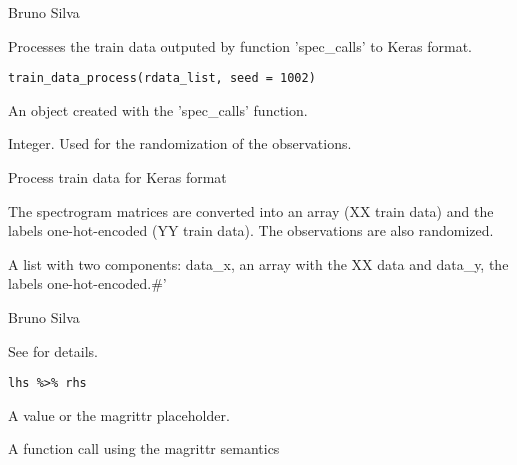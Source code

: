 \documentclass[letterpaper]{book}
\begin{document}
%
\begin{Author}\relax
Bruno Silva
\end{Author}
%
\begin{Description}\relax
Processes the train data outputed by function 'spec\_calls' to
Keras format.
\end{Description}
%
\begin{Usage}
\begin{verbatim}
train_data_process(rdata_list, seed = 1002)
\end{verbatim}
\end{Usage}
%
\begin{Arguments}
\begin{ldescription}
\item[\code{rdata\_list}] An object created with
the 'spec\_calls' function.

\item[\code{seed}] Integer. Used for the randomization of the observations.
\end{ldescription}
\end{Arguments}
%
\begin{Details}\relax
Process train data for Keras format

The spectrogram matrices are converted into an
array (XX train data) and the labels one-hot-encoded (YY train data). The
observations are also randomized.
\end{Details}
%
\begin{Value}
A list with two components: data\_x, an array with the XX data and
data\_y, the labels one-hot-encoded.\#'
\end{Value}
%
\begin{Author}\relax
Bruno Silva
\end{Author}
%
\begin{Description}\relax
See  for details.
\end{Description}
%
\begin{Usage}
\begin{verbatim}
lhs %>% rhs
\end{verbatim}
\end{Usage}
%
\begin{Arguments}
\begin{ldescription}
\item[\code{lhs}] A value or the magrittr placeholder.

\item[\code{rhs}] A function call using the magrittr semantics
\end{ldescription}
\end{Arguments}
\printindex{}
\end{document}
